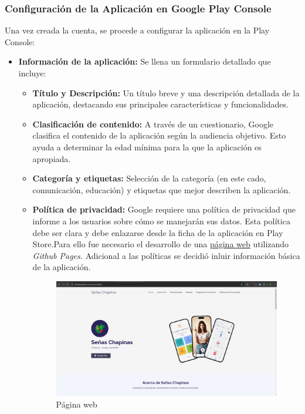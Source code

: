 \subsubsection{Configuración de la Aplicación en Google Play Console}

Una vez creada la cuenta, se procede a configurar la aplicación en la Play Console:

\begin{itemize}
    \item \textbf{Información de la aplicación:} Se llena un formulario detallado que incluye:
    \begin{itemize}
        \item \textbf{Título y Descripción:} Un título breve y una descripción detallada de la aplicación, destacando sus principales características y funcionalidades.
        \item \textbf{Clasificación de contenido:} A través de un cuestionario, Google clasifica el contenido de la aplicación según la audiencia objetivo. Esto ayuda a determinar la edad mínima para la que la aplicación es apropiada.
        \item \textbf{Categoría y etiquetas:} Selección de la categoría (en este cado, comunicación, educación) y etiquetas que mejor describen la aplicación.
        \item \textbf{Política de privacidad:} Google requiere una política de privacidad que informe a los usuarios sobre cómo se manejarán sus datos. Esta política debe ser clara y debe enlazarse desde la ficha de la aplicación en Play Store.Para ello fue necesario el desarrollo de una \href{https://20candy.github.io/SenasChapinasWeb/}{página web} utilizando \textit{Github Pages.} Adicional a las políticas se decidió inluir información básica de la aplicación. 

        \begin{figure} [H]
            \centering
            \includegraphics[width=0.8\linewidth]{figuras/pagina_web.png}
            \caption{Página web}
            \label{fig:enter-label}
        \end{figure}


\end{itemize}
\end{itemize}
